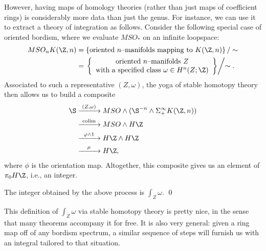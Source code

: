 However, having maps of homology theories (rather than just maps of coefficient rings) is considerably more data than just the genus.  For instance, we can use it to extract a theory of integration as follows.  Consider the following special case of oriented bordism, where we evaluate $MSO_*$ on an infinite loopspace:
\begin{align*}
MSO_n K(\Z, n) & = \left\{ \text{oriented $n$--manifolds mapping to $K(\Z, n)$} \right\} / \sim \\
& = \left. \left\{ \begin{array}{c}\text{oriented $n$--manifolds $Z$} \\ \text{with a specified class $\omega \in H^n(Z; \Z)$} \end{array}\right\} \middle/ \sim \right. .
\end{align*}
Associated to such a representative $(Z, \omega)$, the yoga of stable homotopy theory then allows us to build a composite
\begin{align*}
\S & \xrightarrow{\mathmakebox[2.5em]{(Z, \omega)}} MSO \sm (\S^{-n} \sm \Susp^\infty_+ K(\Z, n)) \\ 
& \xrightarrow{\mathmakebox[2.5em]{\colim}} MSO \sm H\Z \\
& \xrightarrow{\mathmakebox[2.5em]{\phi \sm 1}} H\Z \sm H\Z \\
& \xrightarrow{\mathmakebox[2.5em]{\mu}} H\Z,
\end{align*}
where $\phi$ is the orientation map.  Altogether, this composite gives us an element of $\pi_0 H\Z$, i.e., an integer.

\begin{lemma}
The integer obtained by the above process is $\int_Z \omega$. \qed
\end{lemma}

\noindent This definition of $\int_Z \omega$ via stable homotopy theory is pretty nice, in the sense that many theorems accompany it for free.  It is also very general: given a ring map off of any bordism spectrum, a similar sequence of steps will furnish us with an integral tailored to that situation.

